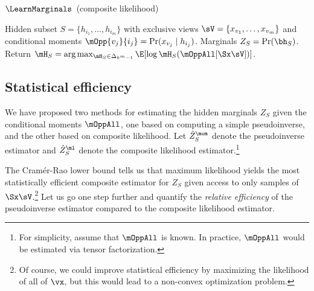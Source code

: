 \begin{algorithm}
  \caption{$\LearnMarginals$~(composite likelihood)}
  \label{algo:piecewise}
  \begin{algorithmic}
    \REQUIRE Hidden subset $S = \{ h_{i_1}, \dots, h_{i_m} \}$ with exclusive views $\sV = \{ x_{v_1}, \dots, x_{v_m} \}$
    and conditional moments $\mOpp{v_j}{i_j} = \Pr(x_{v_j} \mid h_{i_j})$.
    \ENSURE Marginals $Z_S = \Pr(\bh_S)$.
    \STATE Return $\mH_S = \arg\max_{\mH_S \in \Delta_{k^m-1}} \E[\log \mH_S(\mOppAll[\Sx \sV])]$.
  \end{algorithmic}
\end{algorithm}

\subsection{Statistical efficiency}

We have proposed two methods for estimating the hidden marginals $Z_S$ given
the conditional moments $\mOppAll$, one based on computing a simple pseudoinverse,
and the other based on composite likelihood.
Let $\hat Z^\mom_S$ denote the pseudoinverse estimator and $\hat
  Z^\ml_S$ denote the composite likelihood estimator.\footnote{For simplicity, assume that $\mOppAll$ is known.
  In practice, $\mOppAll$ would be estimated via tensor factorization.}

The Cram\'{e}r-Rao lower bound tells us that maximum likelihood yields the
  most statistically efficient composite estimator for $Z_S$ given
  access to only samples of $\Sx\sV$.\footnote{Of course, we could improve
  statistical efficiency by maximizing the likelihood of all of $\vx$, but
  this would lead to a non-convex optimization problem.}
Let us go one step further and quantify the \emph{relative efficiency} of the pseudoinverse
  estimator compared to the composite likelihood estimator.


